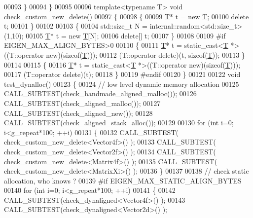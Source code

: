 \begin{DoxyCode}
00093   \}
00094 \}
00095 
00096 \textcolor{keyword}{template}<\textcolor{keyword}{typename} T> \textcolor{keywordtype}{void} check\_custom\_new\_delete()
00097 \{
00098   \{
00099     \hyperlink{group___sparse_core___module}{T}* t = \textcolor{keyword}{new} \hyperlink{group___sparse_core___module}{T};
00100     \textcolor{keyword}{delete} t;
00101   \}
00102   
00103   \{
00104     std::size\_t N = internal::random<std::size\_t>(1,10);
00105     \hyperlink{group___sparse_core___module}{T}* t = \textcolor{keyword}{new} \hyperlink{group___sparse_core___module}{T}[N];
00106     \textcolor{keyword}{delete}[] t;
00107   \}
00108   
00109 \textcolor{preprocessor}{#if EIGEN\_MAX\_ALIGN\_BYTES>0}
00110   \{
00111     \hyperlink{group___sparse_core___module}{T}* t = \textcolor{keyword}{static\_cast<}\hyperlink{group___sparse_core___module}{T} *\textcolor{keyword}{>}((T::operator \textcolor{keyword}{new})(\textcolor{keyword}{sizeof}(\hyperlink{group___sparse_core___module}{T})));
00112     (T::operator \textcolor{keyword}{delete})(t, \textcolor{keyword}{sizeof}(\hyperlink{group___sparse_core___module}{T}));
00113   \}
00114   
00115   \{
00116     \hyperlink{group___sparse_core___module}{T}* t = \textcolor{keyword}{static\_cast<}\hyperlink{group___sparse_core___module}{T} *\textcolor{keyword}{>}((T::operator \textcolor{keyword}{new})(\textcolor{keyword}{sizeof}(\hyperlink{group___sparse_core___module}{T})));
00117     (T::operator \textcolor{keyword}{delete})(t);
00118   \}
00119 \textcolor{preprocessor}{#endif}
00120 \}
00121 
00122 \textcolor{keywordtype}{void} test\_dynalloc()
00123 \{
00124   \textcolor{comment}{// low level dynamic memory allocation}
00125   CALL\_SUBTEST(check\_handmade\_aligned\_malloc());
00126   CALL\_SUBTEST(check\_aligned\_malloc());
00127   CALL\_SUBTEST(check\_aligned\_new());
00128   CALL\_SUBTEST(check\_aligned\_stack\_alloc());
00129 
00130   \textcolor{keywordflow}{for} (\textcolor{keywordtype}{int} i=0; i<g\_repeat*100; ++i)
00131   \{
00132     CALL\_SUBTEST( check\_custom\_new\_delete<Vector4f>() );
00133     CALL\_SUBTEST( check\_custom\_new\_delete<Vector2f>() );
00134     CALL\_SUBTEST( check\_custom\_new\_delete<Matrix4f>() );
00135     CALL\_SUBTEST( check\_custom\_new\_delete<MatrixXi>() );
00136   \}
00137   
00138   \textcolor{comment}{// check static allocation, who knows ?}
00139 \textcolor{preprocessor}{  #if EIGEN\_MAX\_STATIC\_ALIGN\_BYTES}
00140   \textcolor{keywordflow}{for} (\textcolor{keywordtype}{int} i=0; i<g\_repeat*100; ++i)
00141   \{
00142     CALL\_SUBTEST(check\_dynaligned<Vector4f>() );
00143     CALL\_SUBTEST(check\_dynaligned<Vector2d>() );

\end{DoxyCode}
